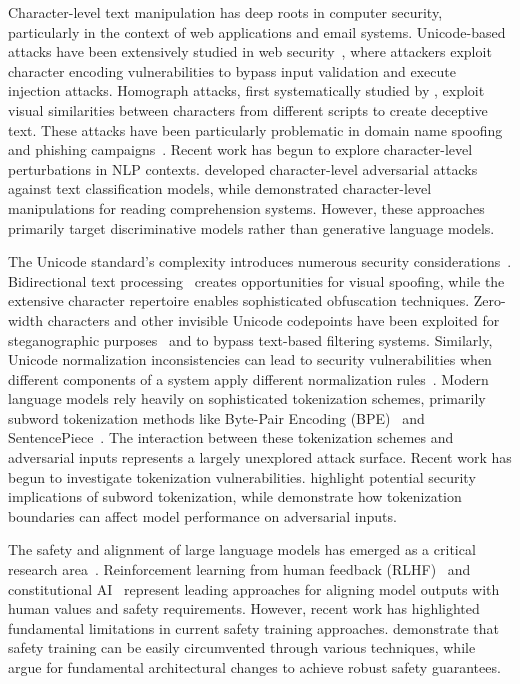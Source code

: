 \documentclass[11pt]{article}
\begin{document}
\begin{multicols}{2}
Character-level text manipulation has deep roots in computer security, particularly in the context of web applications and email systems. Unicode-based attacks have been extensively studied in web security~\citep{sullivan2011web,barth2010unicode}, where attackers exploit character encoding vulnerabilities to bypass input validation and execute injection attacks. Homograph attacks, first systematically studied by \citet{gabrilovich2002homograph}, exploit visual similarities between characters from different scripts to create deceptive text. These attacks have been particularly problematic in domain name spoofing~\citep{holgers2006script} and phishing campaigns~\citep{liu2005homograph}. Recent work has begun to explore character-level perturbations in NLP contexts. \citet{li2018textbugger} developed character-level adversarial attacks against text classification models, while \citet{ebrahimi2017hotflip} demonstrated character-level manipulations for reading comprehension systems. However, these approaches primarily target discriminative models rather than generative language models.

The Unicode standard's complexity introduces numerous security considerations~\citep{davis2008unicode,mcgowan2006international}. Bidirectional text processing~\citep{davis2009unicode} creates opportunities for visual spoofing, while the extensive character repertoire enables sophisticated obfuscation techniques. Zero-width characters and other invisible Unicode codepoints have been exploited for steganographic purposes~\citep{por2012unicodes} and to bypass text-based filtering systems. Similarly, Unicode normalization inconsistencies can lead to security vulnerabilities when different components of a system apply different normalization rules~\citep{davis2012unicode}. Modern language models rely heavily on sophisticated tokenization schemes, primarily subword tokenization methods like Byte-Pair Encoding (BPE)~\citep{sennrich2015neural} and SentencePiece~\citep{kudo2018sentencepiece}. The interaction between these tokenization schemes and adversarial inputs represents a largely unexplored attack surface. Recent work has begun to investigate tokenization vulnerabilities. \citet{kudo2018subword} highlight potential security implications of subword tokenization, while \citet{liu2023lost} demonstrate how tokenization boundaries can affect model performance on adversarial inputs.

The safety and alignment of large language models has emerged as a critical research area~\citep{ouyang2022training,bai2022constitutional}. Reinforcement learning from human feedback (RLHF)~\citep{christiano2017deep} and constitutional AI~\citep{bai2022constitutional} represent leading approaches for aligning model outputs with human values and safety requirements. However, recent work has highlighted fundamental limitations in current safety training approaches. \citet{casper2023open} demonstrate that safety training can be easily circumvented through various techniques, while \citet{wolf2023fundamental} argue for fundamental architectural changes to achieve robust safety guarantees.


\end{multicols}
\end{document}
